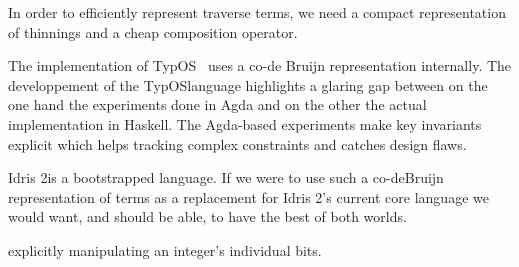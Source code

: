 \documentclass{article}
\newcommand{\typos}{TypOS}
\newcommand{\idris}{Idris 2}
\begin{document}
In order to efficiently represent traverse terms, we need a compact representation of
thinnings and a cheap composition operator.


The implementation of \typos~\cite{MANUAL:talk/types/Allais22} uses a co-de Bruijn
representation internally. 
%
The developpement of the \typos language highlights a glaring gap between on the
one hand the experiments done in Agda and on the other the actual implementation
in Haskell.
%
The Agda-based experiments make key invariants explicit which helps tracking
complex constraints and catches design flaws.


\idris is a bootstrapped language. If we were to use such a co-deBruijn representation
of terms as a replacement for \idris's current core language we would want, and should
be able, to have the best of both worlds.


explicitly manipulating an integer's individual bits.



\end{document}
